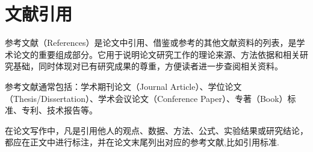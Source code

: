 \chapter{文献引用}

参考文献（References）是论文中引用、借鉴或参考的其他文献资料的列表，是学术论文的重要组成部分。它用于说明论文研究工作的理论来源、方法依据和相关研究基础，同时体现对已有研究成果的尊重，方便读者进一步查阅相关资料。

参考文献通常包括：学术期刊论文（Journal Article）、学位论文（Thesis/Dissertation）、学术会议论文（Conference Paper）、专著（Book）标准、专利、技术报告等。

在论文写作中，凡是引用他人的观点、数据、方法、公式、实验结果或研究结论，都应在正文中进行标注，并在论文末尾列出对应的参考文献,比如引用标准\cite{jianduju1994}.